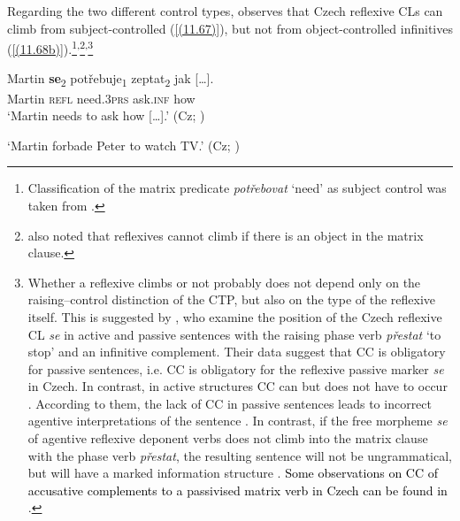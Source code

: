 Regarding the two different control types, \citet[129f]{Hana07} observes that Czech reflexive CLs can climb from subject-controlled (\ref{(11.67)}), but not from object-con\-trolled infinitives (\ref{(11.68b)}).\footnote{Classification of the matrix predicate \textit{potřebovat} ‘need’ as subject control was taken from \citet[130]{Hana07}.}\textsuperscript{,}\footnote{\citet[81]{Dotlacil04} also noted that reflexives cannot climb if there is an object in the matrix clause.}\textsuperscript{,}\footnote{Whether a reflexive climbs or not probably does not depend only on the raising--control distinction of the CTP, but also on the type of the reflexive itself. This is suggested by \citet{LesnerovaMalink08}, who examine the position of the Czech reflexive CL \textit{se} in active and passive sentences with the raising phase verb \textit{přestat} `to stop' and an infinitive complement. Their data suggest that CC is obligatory for passive sentences, i.e. CC is obligatory for the reflexive passive marker \textit{se} in Czech. In contrast, in active structures CC can but does not have to occur \citep[cf.][400f] {LesnerovaMalink08}. According to them, the lack of CC in passive sentences leads to incorrect agentive interpretations of the sentence \citep[cf.][396, 400f] {LesnerovaMalink08}. In contrast, if the free morpheme \textit{se} of agentive reflexive deponent verbs does not climb into the matrix clause with the phase verb \textit{přestat}, the resulting sentence will not be ungrammatical, but will have a marked information structure \citep[cf.][499f] {LesnerovaMalink08}. \textcolor{black}{Some observations on CC of accusative complements to a passivised matrix verb in Czech can be found in \citet[159]{Lenertova04}}.} 

\begin{exe}\ex\label{(11.67)}
\gll Martin \textbf{se}\textsubscript{2} potřebuje\textsubscript{1} zeptat\textsubscript{2} {jak [\dots].} \\
Martin \textsc{refl} need.3\textsc{prs} ask.\textsc{inf} how \\
\glt ‘Martin needs to ask how [\dots].’
\hfill (Cz; \citealt[130]{Hana07})

\ex
\begin{xlist}
\end{xlist}
\glt‘Martin forbade Peter to watch TV.’
\hfill (Cz; \citealt[129]{Hana07})
\end{exe}

